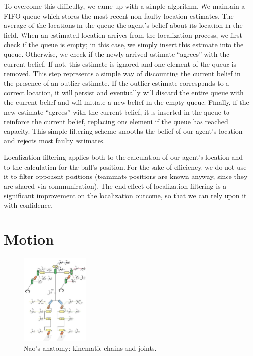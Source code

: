  

To overcome this difficulty, we came up with a simple algorithm. We maintain a FIFO queue which stores the most recent non-faulty location estimates. The average of the locations in the queue the agent's belief about its location in the field. When an estimated location arrives from the localization process, we first check if the queue is empty; in this case, we simply insert this estimate into the queue. Otherwise, we check if the newly arrived estimate ``agrees'' with the current belief. If not, this estimate is ignored and one element of the queue is removed. This step represents a simple way of discounting the current belief in the presence of an outlier estimate. If the outlier estimate corresponds to a correct location, it will persist and eventually will discard the entire queue with the current belief and will initiate a new belief in the empty queue. Finally, if the new estimate ``agrees'' with the current belief, it is inserted in the queue to reinforce the current belief, replacing one element if the queue has reached capacity. This simple filtering scheme smooths the belief of our agent's location and rejects most faulty estimates.

Localization filtering applies both to the calculation of our agent's location and to the calculation for the ball's position. For the sake of efficiency, we do not use it to filter opponent positions (teammate positions are known anyway, since they are shared via communication). The end effect of localization filtering is a significant improvement on the localization outcome, so that we can rely upon it with confidence. 



\section{Motion}
\label{Motions}

\begin{figure}[t!]
\centering
  \includegraphics[width=0.3\textwidth]{Chapter3/figures/Models_NaoAnatomy.png}
  \caption{Nao's anatomy: kinematic chains and joints.}
  \label{fig:NaoAnatomy}
\end{figure}

